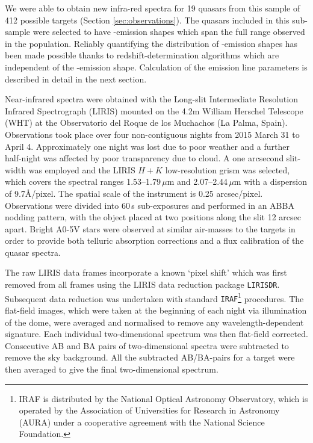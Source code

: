 We were able to obtain new infra-red spectra for 19 quasars from this sample of 412 possible targets (Section \ref{sec:observations}). 
The quasars included in this sub-sample were selected to have -emission shapes which span the full range observed in the population.
Reliably quantifying the distribution of -emission shapes has been made possible thanks to redshift-determination algorithms \citep[][Allen \& Hewett 2016, in preparation]{hewett10} which are independent of the -emission shape. 
Calculation of the  emission line parameters is described in detail in the next section. 

Near-infrared spectra were obtained with the Long-slit Intermediate Resolution Infrared Spectrograph (LIRIS) mounted on the 4.2m William Herschel Telescope (WHT) at the Observatorio del Roque de los Muchachos (La Palma, Spain). 
Observations took place over four non-contiguous nights from 2015 March 31 to April 4. 
Approximately one night was lost due to poor weather and a further half-night was affected by poor transparency due to cloud. 
A one arcsecond slit-width was employed and the LIRIS $H+K$ low-resolution grism was selected, which covers the spectral ranges 1.53--1.79\,$\mu$m and 2.07--2.44\,$\mu$m with a dispersion of 9.7\AA/pixel. 
The spatial scale of the instrument is 0.25 arcsec/pixel. 
Observations were divided into 60\,s sub-exposures and performed in an ABBA nodding pattern, with the object placed at two positions along the slit 12 arcsec apart. 
Bright A0-5V stars were observed at similar air-masses to the targets in order to provide both telluric absorption corrections and a flux calibration of the quasar spectra.

The raw LIRIS data frames incorporate a known `pixel shift' which was first removed from all frames using the LIRIS data reduction package {\tt LIRISDR}. 
Subsequent data reduction was undertaken with standard {\tt IRAF}\footnote{IRAF is distributed by the National Optical Astronomy Observatory, which is operated by the Association of Universities for Research in Astronomy (AURA) under a cooperative agreement with the National Science Foundation.} procedures.  
The flat-field images, which were taken at the beginning of each night via illumination of the dome, were averaged and normalised to remove any wavelength-dependent signature. 
Each individual two-dimensional spectrum was then flat-field corrected. 
Consecutive AB and BA pairs of two-dimensional spectra were subtracted to remove the sky background. 
All the subtracted AB/BA-pairs for a target were then averaged to give the final two-dimensional spectrum.

